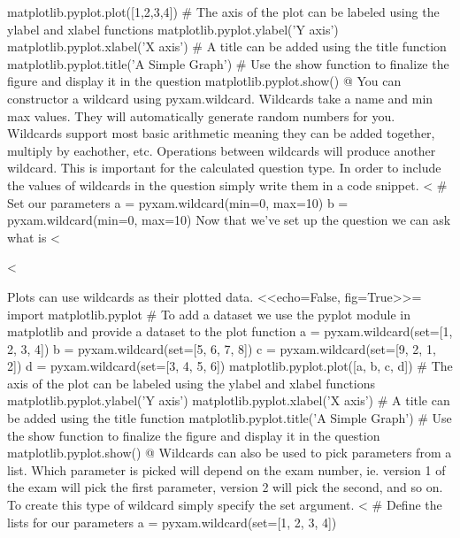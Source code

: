 \documentclass[12pt]{exam}
\begin{document}
\begin{questions}
matplotlib.pyplot.plot([1,2,3,4])
# The axis of the plot can be labeled using the ylabel and xlabel functions
matplotlib.pyplot.ylabel('Y axis')
matplotlib.pyplot.xlabel('X axis')
# A title can be added using the title function
matplotlib.pyplot.title('A Simple Graph')
# Use the show function to finalize the figure and display it in the question
matplotlib.pyplot.show()
@
                You can constructor a wildcard using pyxam.wildcard. Wildcards take a name and min max values. They will
                automatically generate random numbers for you. Wildcards support most basic arithmetic meaning they can
                be added together, multiply by eachother, etc. Operations between wildcards will produce another
                wildcard. This is important for the calculated question type. In order to include the values of
                wildcards in the question simply write them in a code snippet.
<%
# Set our parameters
a = pyxam.wildcard(min=0, max=10)
b = pyxam.wildcard(min=0, max=10)
                Now that we've set up the question we can ask what is <%
                \begin{solution}
                    <%
                \end{solution}
                Plots can use wildcards as their plotted data.
<<echo=False, fig=True>>=
import matplotlib.pyplot
# To add a dataset we use the pyplot module in matplotlib and provide a dataset to the plot function
a = pyxam.wildcard(set=[1, 2, 3, 4])
b = pyxam.wildcard(set=[5, 6, 7, 8])
c = pyxam.wildcard(set=[9, 2, 1, 2])
d = pyxam.wildcard(set=[3, 4, 5, 6])
matplotlib.pyplot.plot([a, b, c, d])
# The axis of the plot can be labeled using the ylabel and xlabel functions
matplotlib.pyplot.ylabel('Y axis')
matplotlib.pyplot.xlabel('X axis')
# A title can be added using the title function
matplotlib.pyplot.title('A Simple Graph')
# Use the show function to finalize the figure and display it in the question
matplotlib.pyplot.show()
@
                Wildcards can also be used to pick parameters from a list. Which parameter is picked will depend on the
                exam number, ie. version 1 of the exam will pick the first parameter, version 2 will pick the second,
                and so on. To create this type of wildcard simply specify the set argument.
<%
# Define the lists for our parameters
a = pyxam.wildcard(set=[1, 2, 3, 4])

\end{questions}
\end{document}
